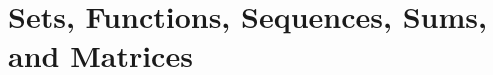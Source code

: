 \documentclass[../discrete.tex]{subfiles}
\begin{document}
\chapter{Sets, Functions, Sequences, Sums, and Matrices}
\end{document}
